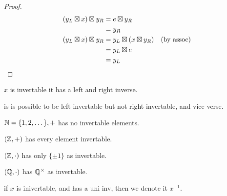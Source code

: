 \documentclass[12pt]{article}
\newcommand{\gop}[0]{\boxtimes}
\begin{document}
\bboxproof
\begin{proof}
  \begin{equation*}
    \begin{split}
      (y_L\gop x)\gop y_R &=e\gop y_R\\
                          &=y_R\\
      (y_L\gop x)\gop y_R&=y_L\gop(x\gop y_R)\quad\T{(by assoc)}\\
                         &=y_L\gop e\\
                         &=y_L
    \end{split}
  \end{equation*}
\end{proof}
\ebox

\bboxnote
{} \(x\) is invertable  it has a left and right
inverse.
\ebox

\bboxnote
{} is is possible to be left invertable but not right invertable, and
vice verse.
\ebox

\bboxex
\(\mathbb N=\{1,2,\dots\},+\) has no invertable elements.

\((\mathbb Z,+)\) has every element invertable.

\((\mathbb Z,\cdot)\) has only \(\{\pm 1\}\) as invertable.

\((\mathbb Q,\cdot)\) has \(\mathbb Q^\times\) as invertable.
\ebox

\bboxnote
\begin{nota}[Inverse]\label{nota:inv}
  if \(x\) is inivertable, and has a uni inv, then we denote it
  \(x^{-1}\).
\end{nota}
\ebox
\end{document}
